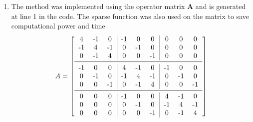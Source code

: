 \begin{enumerate}
	\item {\color{blue} The method was implemented using the operator matrix $\mathbf{A}$ \cite{Demmel:1997:ANL:264989} and is generated at line 1 in the code.  The sparse function was also used on the matrix to save computational power and time
	\begin{equation}
			A = \left[
			\begin{tabular}{ccc|ccc|ccc}
			4  & -1 & 0		& -1 & 0 & 0 	& 0 & 0 & 0\\
			-1 & 4  & -1 	& 0 & -1 & 0 	& 0 & 0 & 0\\
			0  & -1 & 4  	& 0 & 0 & -1 	& 0 & 0 & 0\\
			\midrule
			-1 & 0  & 0  	& 4 & -1 & 0 	& -1 & 0 & 0\\
			0  & -1 & 0  	& -1 & 4 & -1 	& 0 & -1 & 0\\
			0  & 0  & -1 	& 0 & -1 & 4 	& 0 & 0 & -1\\
			\midrule
			0  & 0  & 0  	& -1 & 0 & 0 	& 4 & -1 & 0\\
			0  & 0  & 0  	& 0 & -1 & 0 	& -1 & 4 & -1\\
			0  & 0  & 0  	& 0 & 0 & -1 	& 0 & -1 & 4\\
			\end{tabular}\right]
			\label{eq:matrixA}
		\end{equation}}
\end{enumerate}

